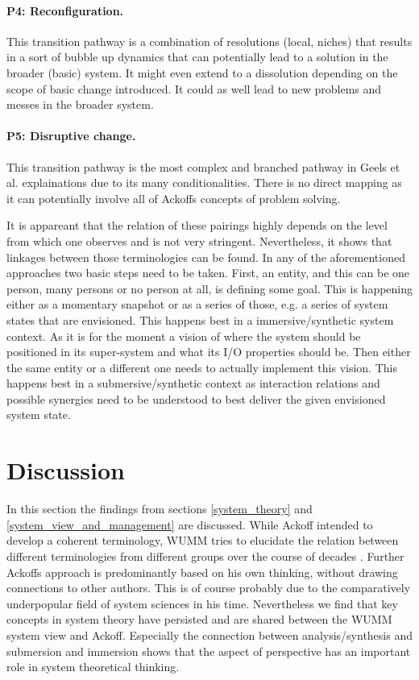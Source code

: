 \documentclass[a4paper,11pt]{article}
\begin{document}
\paragraph{P4: Reconfiguration.}
This transition pathway is a combination of resolutions (local, niches) that
results in a sort of bubble up dynamics that can potentially lead to a
solution in the broader (basic) system. It might even extend to a dissolution
depending on the scope of basic change introduced. It could as well lead to
new problems and messes in the broader system.

\paragraph{P5: Disruptive change.}
This transition pathway is the most complex and branched pathway in Geels et
al. explainations due to its many conditionalities. There is no direct mapping
as it can potentially involve all of Ackoffs concepts of problem solving.  
\bigskip

It is appareant that the relation of these pairings highly depends on the
level from which one observes and is not very stringent.  Nevertheless, it
shows that linkages between those terminologies can be found. In any of the
aforementioned approaches two basic steps need to be taken. First, an entity,
and this can be one person, many persons or no person at all, is defining some
goal. This is happening either as a momentary snapshot or as a series of
those, e.g. a series of system states that are envisioned. This happens best
in a immersive/synthetic system context. As it is for the moment a vision of
where the system should be positioned in its super-system and what its I/O
properties should be. Then either the same entity or a different one needs to
actually implement this vision. This happens best in a submersive/synthetic
context as interaction relations and possible synergies need to be understood
to best deliver the given envisioned system state.

\section{Discussion}

In this section the findings from sections \ref{system_theory} and
\ref{system_view_and_management} are discussed.  While Ackoff intended to
develop a coherent terminology, WUMM tries to elucidate the relation between
different terminologies from different groups over the course of decades
\cite{grabe2020seminar}. Further Ackoffs approach is predominantly based on
his own thinking, without drawing connections to other authors. This is of
course probably due to the comparatively underpopular field of system sciences
in his time. Nevertheless we find that key concepts in system theory have
persisted and are shared between the WUMM system view and Ackoff. Especially
the connection between analysis/synthesis and submersion and immersion shows
that the aspect of perspective has an important role in system theoretical
thinking.
\end{document}
